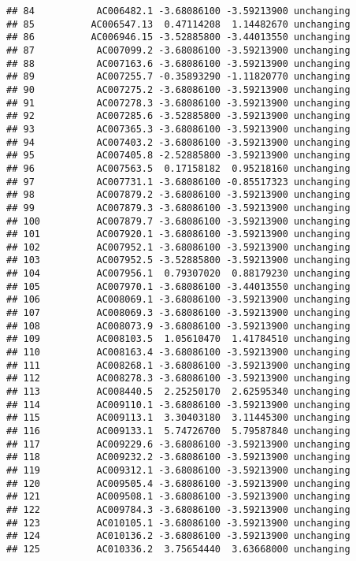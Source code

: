 \documentclass[]{article}
\begin{document}
\begin{verbatim}
## 84           AC006482.1 -3.68086100 -3.59213900 unchanging
## 85          AC006547.13  0.47114208  1.14482670 unchanging
## 86          AC006946.15 -3.52885800 -3.44013550 unchanging
## 87           AC007099.2 -3.68086100 -3.59213900 unchanging
## 88           AC007163.6 -3.68086100 -3.59213900 unchanging
## 89           AC007255.7 -0.35893290 -1.11820770 unchanging
## 90           AC007275.2 -3.68086100 -3.59213900 unchanging
## 91           AC007278.3 -3.68086100 -3.59213900 unchanging
## 92           AC007285.6 -3.52885800 -3.59213900 unchanging
## 93           AC007365.3 -3.68086100 -3.59213900 unchanging
## 94           AC007403.2 -3.68086100 -3.59213900 unchanging
## 95           AC007405.8 -2.52885800 -3.59213900 unchanging
## 96           AC007563.5  0.17158182  0.95218160 unchanging
## 97           AC007731.1 -3.68086100 -0.85517323 unchanging
## 98           AC007879.2 -3.68086100 -3.59213900 unchanging
## 99           AC007879.3 -3.68086100 -3.59213900 unchanging
## 100          AC007879.7 -3.68086100 -3.59213900 unchanging
## 101          AC007920.1 -3.68086100 -3.59213900 unchanging
## 102          AC007952.1 -3.68086100 -3.59213900 unchanging
## 103          AC007952.5 -3.52885800 -3.59213900 unchanging
## 104          AC007956.1  0.79307020  0.88179230 unchanging
## 105          AC007970.1 -3.68086100 -3.44013550 unchanging
## 106          AC008069.1 -3.68086100 -3.59213900 unchanging
## 107          AC008069.3 -3.68086100 -3.59213900 unchanging
## 108          AC008073.9 -3.68086100 -3.59213900 unchanging
## 109          AC008103.5  1.05610470  1.41784510 unchanging
## 110          AC008163.4 -3.68086100 -3.59213900 unchanging
## 111          AC008268.1 -3.68086100 -3.59213900 unchanging
## 112          AC008278.3 -3.68086100 -3.59213900 unchanging
## 113          AC008440.5  2.25250170  2.62595340 unchanging
## 114          AC009110.1 -3.68086100 -3.59213900 unchanging
## 115          AC009113.1  3.30403180  3.11445300 unchanging
## 116          AC009133.1  5.74726700  5.79587840 unchanging
## 117          AC009229.6 -3.68086100 -3.59213900 unchanging
## 118          AC009232.2 -3.68086100 -3.59213900 unchanging
## 119          AC009312.1 -3.68086100 -3.59213900 unchanging
## 120          AC009505.4 -3.68086100 -3.59213900 unchanging
## 121          AC009508.1 -3.68086100 -3.59213900 unchanging
## 122          AC009784.3 -3.68086100 -3.59213900 unchanging
## 123          AC010105.1 -3.68086100 -3.59213900 unchanging
## 124          AC010136.2 -3.68086100 -3.59213900 unchanging
## 125          AC010336.2  3.75654440  3.63668000 unchanging

\end{verbatim}
\end{document}
